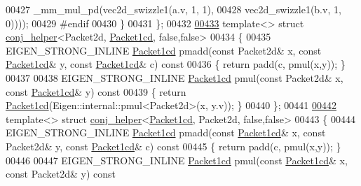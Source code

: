 \begin{DoxyCode}
00427                                 \_mm\_mul\_pd(vec2d\_swizzle1(a.v, 1, 1),
00428                                            vec2d\_swizzle1(b.v, 1, 0))));
00429 \textcolor{preprocessor}{    #endif}
00430   \}
00431 \};
00432 
\hyperlink{struct_eigen_1_1internal_1_1conj__helper_3_01_packet2d_00_01_packet1cd_00_01false_00_01false_01_4}{00433} \textcolor{keyword}{template}<> \textcolor{keyword}{struct }\hyperlink{struct_eigen_1_1internal_1_1conj__helper}{conj\_helper}<Packet2d, \hyperlink{struct_eigen_1_1internal_1_1_packet1cd}{Packet1cd}, false,false>
00434 \{
00435   EIGEN\_STRONG\_INLINE \hyperlink{struct_eigen_1_1internal_1_1_packet1cd}{Packet1cd} pmadd(\textcolor{keyword}{const} Packet2d& x, \textcolor{keyword}{const} 
      \hyperlink{struct_eigen_1_1internal_1_1_packet1cd}{Packet1cd}& y, \textcolor{keyword}{const} \hyperlink{struct_eigen_1_1internal_1_1_packet1cd}{Packet1cd}& c)\textcolor{keyword}{ const}
00436 \textcolor{keyword}{  }\{ \textcolor{keywordflow}{return} padd(c, pmul(x,y)); \}
00437 
00438   EIGEN\_STRONG\_INLINE \hyperlink{struct_eigen_1_1internal_1_1_packet1cd}{Packet1cd} pmul(\textcolor{keyword}{const} Packet2d& x, \textcolor{keyword}{const} \hyperlink{struct_eigen_1_1internal_1_1_packet1cd}{Packet1cd}& y)\textcolor{keyword}{ const}
00439 \textcolor{keyword}{  }\{ \textcolor{keywordflow}{return} \hyperlink{struct_eigen_1_1internal_1_1_packet1cd}{Packet1cd}(Eigen::internal::pmul<Packet2d>(x, y.v)); \}
00440 \};
00441 
\hyperlink{struct_eigen_1_1internal_1_1conj__helper_3_01_packet1cd_00_01_packet2d_00_01false_00_01false_01_4}{00442} \textcolor{keyword}{template}<> \textcolor{keyword}{struct }\hyperlink{struct_eigen_1_1internal_1_1conj__helper}{conj\_helper}<\hyperlink{struct_eigen_1_1internal_1_1_packet1cd}{Packet1cd}, Packet2d, false,false>
00443 \{
00444   EIGEN\_STRONG\_INLINE \hyperlink{struct_eigen_1_1internal_1_1_packet1cd}{Packet1cd} pmadd(\textcolor{keyword}{const} \hyperlink{struct_eigen_1_1internal_1_1_packet1cd}{Packet1cd}& x, \textcolor{keyword}{const} Packet2d& y, \textcolor{keyword}{const} 
      \hyperlink{struct_eigen_1_1internal_1_1_packet1cd}{Packet1cd}& c)\textcolor{keyword}{ const}
00445 \textcolor{keyword}{  }\{ \textcolor{keywordflow}{return} padd(c, pmul(x,y)); \}
00446 
00447   EIGEN\_STRONG\_INLINE \hyperlink{struct_eigen_1_1internal_1_1_packet1cd}{Packet1cd} pmul(\textcolor{keyword}{const} \hyperlink{struct_eigen_1_1internal_1_1_packet1cd}{Packet1cd}& x, \textcolor{keyword}{const} Packet2d& y)\textcolor{keyword}{ const}

\end{DoxyCode}

